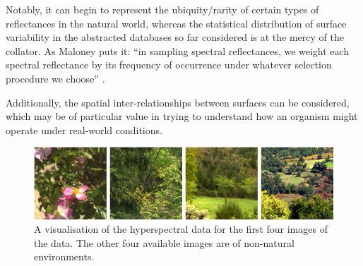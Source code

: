 Notably, it can begin to represent the ubiquity/rarity of certain types of reflectances in the natural world, whereas the statistical distribution of surface variability in the abstracted databases so far considered is at the mercy of the collator. As Maloney puts it: ``in sampling spectral reflectances, we weight each spectral reflectance by its frequency of occurrence under whatever selection procedure we choose'' \cite{maloney_computational_1984}.

Additionally, the spatial inter-relationships between surfaces can be considered, which may be of particular value in trying to understand how an organism might operate under real-world conditions.

\begin{figure}[htbp]
    \includegraphics[max width=\textwidth]{figs/LitRev/Foster.png}
    \caption{A visualisation of the hyperspectral data for the first four images of the \citet{nascimento_statistics_2002} data. The other four available images are of non-natural environments.}
    \label{fig:Foster}
\end{figure} 


